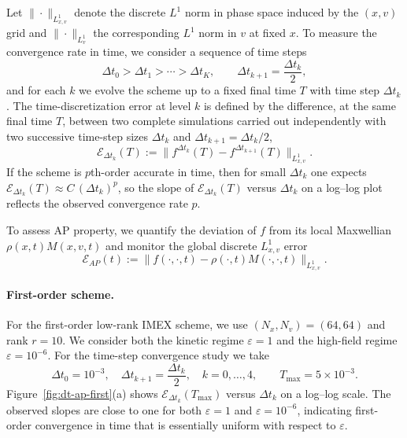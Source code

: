 \documentclass[]{article}
\numberwithin{equation}{section}
\newcommand{\modifysecond}[1]{#1}
\begin{document}
\medskip
Let $\|\cdot\|_{L^1_{x,v}}$ denote the discrete $L^1$ norm in phase space induced by the $(x,v)$ grid and $\|\cdot\|_{L^1_v}$ the corresponding $L^1$ norm in $v$ at fixed $x$.
To measure the convergence rate in time, we consider a sequence of time steps
\[
  \Delta t_0 > \Delta t_1 > \cdots > \Delta t_K,
  \qquad \Delta t_{k+1} = \frac{\Delta t_k}{2},
\]
and for each $k$ we evolve the scheme up to a fixed final time $T$ with time step $\Delta t_k$.
The time-discretization error at level $k$ is defined by \modifysecond{the difference, at the same final time $T$, between two complete simulations carried out independently with two successive time-step sizes $\Delta t_k$ and $\Delta t_{k+1}=\Delta t_k/2$,}
\begin{equation}\label{eq:dt_error_successive}
  \mathcal E_{\Delta t_k}(T)
  := \big\| f^{\Delta t_k}(T) - f^{\Delta t_{k+1}}(T)\big\|_{L^1_{x,v}}.
\end{equation}
If the scheme is $p$th-order accurate in time, then for small $\Delta t_k$ one expects $\mathcal E_{\Delta t_k}(T)\approx C\,(\Delta t_k)^p$, so the slope of $\mathcal E_{\Delta t_k}(T)$ versus $\Delta t_k$ on a log--log plot reflects the observed convergence rate $p$.

To assess AP property, we quantify the deviation of $f$ from its local Maxwellian $\rho(x,t)M(x,v,t)$ and monitor the global discrete $L^1_{x,v}$ error
\begin{equation}\label{eq:AP_error_global}
  \mathcal E_{AP}(t)
  := \big\| f(\cdot,\cdot,t) - \rho(\cdot,t)M(\cdot,\cdot,t)\big\|_{L^1_{x,v}}.
\end{equation}

\paragraph{First-order scheme.}
For the first-order low-rank IMEX scheme, we use $(N_x,N_v)=(64,64)$ and rank $r=10$.
We consider both the kinetic regime $\varepsilon=1$ and the high-field regime $\varepsilon=10^{-6}$. 
For the time-step convergence study we take
\[
  \Delta t_0 = 10^{-3},\quad
  \Delta t_{k+1} = \frac{\Delta t_k}{2},\quad k=0,\dots,4,
  \qquad T_{\max}=5\times 10^{-3}.
\]
Figure~\ref{fig:dt-ap-first}(a) shows $\mathcal E_{\Delta t_k}(T_{\max})$ versus $\Delta t_k$ on a log--log scale. 
The observed slopes are close to one for both $\varepsilon=1$ and $\varepsilon=10^{-6}$, indicating first-order convergence in time that is essentially uniform with respect to $\varepsilon$.
\end{document}
